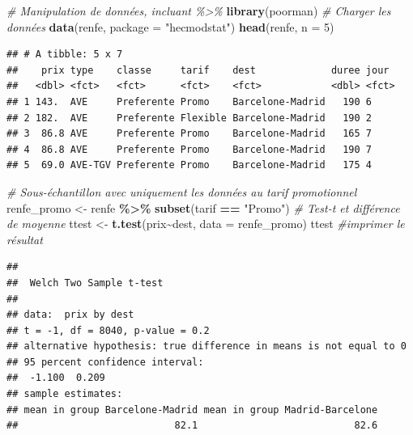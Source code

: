 \documentclass[
  11pt,
  letterpaper,
]{book}
\newenvironment{Shaded}{\begin{snugshade}}{\end{snugshade}}
\newcommand{\CommentTok}[1]{\textcolor[rgb]{0.56,0.35,0.01}{\textit{#1}}}
\newcommand{\DataTypeTok}[1]{\textcolor[rgb]{0.13,0.29,0.53}{#1}}
\newcommand{\DecValTok}[1]{\textcolor[rgb]{0.00,0.00,0.81}{#1}}
\newcommand{\KeywordTok}[1]{\textcolor[rgb]{0.13,0.29,0.53}{\textbf{#1}}}
\newcommand{\NormalTok}[1]{#1}
\newcommand{\OperatorTok}[1]{\textcolor[rgb]{0.81,0.36,0.00}{\textbf{#1}}}
\newcommand{\StringTok}[1]{\textcolor[rgb]{0.31,0.60,0.02}{#1}}
\theoremstyle{definition}
\theoremstyle{definition}
\theoremstyle{definition}
\theoremstyle{remark}
\begin{document}
\begin{Shaded}
\begin{Highlighting}[]
\CommentTok{\# Manipulation de données, incluant \%\textgreater{}\%}
\KeywordTok{library}\NormalTok{(poorman)}
\CommentTok{\# Charger les données}
\KeywordTok{data}\NormalTok{(renfe, }\DataTypeTok{package =} \StringTok{"hecmodstat"}\NormalTok{)}
\KeywordTok{head}\NormalTok{(renfe, }\DataTypeTok{n =} \DecValTok{5}\NormalTok{)}
\end{Highlighting}
\end{Shaded}

\begin{verbatim}
## # A tibble: 5 x 7
##    prix type    classe     tarif    dest             duree jour 
##   <dbl> <fct>   <fct>      <fct>    <fct>            <dbl> <fct>
## 1 143.  AVE     Preferente Promo    Barcelone-Madrid   190 6    
## 2 182.  AVE     Preferente Flexible Barcelone-Madrid   190 2    
## 3  86.8 AVE     Preferente Promo    Barcelone-Madrid   165 7    
## 4  86.8 AVE     Preferente Promo    Barcelone-Madrid   190 7    
## 5  69.0 AVE-TGV Preferente Promo    Barcelone-Madrid   175 4
\end{verbatim}

\begin{Shaded}
\begin{Highlighting}[]
\CommentTok{\# Sous{-}échantillon avec uniquement les données au tarif promotionnel}
\NormalTok{renfe\_promo \textless{}{-}}\StringTok{ }\NormalTok{renfe }\OperatorTok{\%\textgreater{}\%}\StringTok{ }\KeywordTok{subset}\NormalTok{(tarif }\OperatorTok{==}\StringTok{ "Promo"}\NormalTok{)}
\CommentTok{\# Test{-}t et différence de moyenne}
\NormalTok{ttest \textless{}{-}}\StringTok{ }\KeywordTok{t.test}\NormalTok{(prix}\OperatorTok{\textasciitilde{}}\NormalTok{dest, }\DataTypeTok{data =}\NormalTok{ renfe\_promo)}
\NormalTok{ttest }\CommentTok{\#imprimer le résultat}
\end{Highlighting}
\end{Shaded}

\begin{verbatim}
## 
## 	Welch Two Sample t-test
## 
## data:  prix by dest
## t = -1, df = 8040, p-value = 0.2
## alternative hypothesis: true difference in means is not equal to 0
## 95 percent confidence interval:
##  -1.100  0.209
## sample estimates:
## mean in group Barcelone-Madrid mean in group Madrid-Barcelone 
##                           82.1                           82.6
\end{verbatim}
\end{document}
